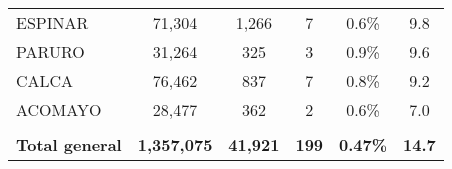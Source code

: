 \begin{tabular}{lccccc}
	\cellcolor[HTML]{FFFF99}ESPINAR                                 & 71,304               & 1,266                                & 7                    & 0.6\%                      & 9.8                                         \\
	\cellcolor[HTML]{FFFF99}PARURO                                  & 31,264               & 325                                  & 3                    & 0.9\%                      & 9.6                                         \\
	\cellcolor[HTML]{FFFF99}CALCA                                   & 76,462               & 837                                  & 7                    & 0.8\%                      & 9.2                                         \\
	\cellcolor[HTML]{FFFF99}ACOMAYO                                 & 28,477               & 362                                  & 2                    & 0.6\%                      & 7.0                                         \\
	& \multicolumn{1}{l}{} & \multicolumn{1}{l}{}                 & \multicolumn{1}{l}{} & \multicolumn{1}{l}{}       & \multicolumn{1}{l}{}                        \\
	\rowcolor[HTML]{DDEBF7} 
	\textbf{Total general}                                          & \textbf{1,357,075}   & \textbf{41,921}                      & \textbf{199}         & \textbf{0.47\%}            & \textbf{14.7}                              
\end{tabular}